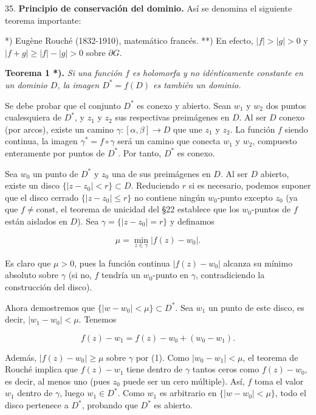 \documentclass{article}
\begin{document}
\hrulefill

35. \textbf{Principio de conservación del dominio.} Así se denomina el siguiente teorema importante:

*) Eugène Rouché (1832-1910), matemático francés.
**) En efecto, \( |f| > |g| > 0 \) y \( |f + g| \geq |f| - |g| > 0 \) sobre \( \partial G \).

\hrulefill

\textbf{Teorema 1 *).} \textit{Si una función \( f \) es holomorfa y no idénticamente constante en un dominio \( D \), la imagen \( D^* = f(D) \) es también un dominio.}

Se debe probar que el conjunto \( D^* \) es conexo y abierto. Sean \( w_1 \) y \( w_2 \) dos puntos cualesquiera de \( D^* \), y \( z_1 \) y \( z_2 \) sus respectivas preimágenes en \( D \). Al ser \( D \) conexo (por arcos), existe un camino \( \gamma: [\alpha, \beta] \to D \) que une \( z_1 \) y \( z_2 \). La función \( f \) siendo continua, la imagen \( \gamma^* = f \circ \gamma \) será un camino que conecta \( w_1 \) y \( w_2 \), compuesto enteramente por puntos de \( D^* \). Por tanto, \( D^* \) es conexo.

Sea \( w_0 \) un punto de \( D^* \) y \( z_0 \) una de sus preimágenes en \( D \). Al ser \( D \) abierto, existe un disco \( \{|z - z_0| < r\} \subset D \). Reduciendo \( r \) si es necesario, podemos suponer que el disco cerrado \( \{|z - z_0| \leq r\} \) no contiene ningún \( w_0 \)-punto excepto \( z_0 \) (ya que \( f \neq \text{const} \), el teorema de unicidad del §22 establece que los \( w_0 \)-puntos de \( f \) están aislados en \( D \)). Sea \( \gamma = \{|z - z_0| = r\} \) y definamos

\[\mu = \min_{z \in \gamma} |f(z) - w_0|. \tag{1}\]

Es claro que \( \mu > 0 \), pues la función continua \( |f(z) - w_0| \) alcanza su mínimo absoluto sobre \( \gamma \) (si no, \( f \) tendría un \( w_0 \)-punto en \( \gamma \), contradiciendo la construcción del disco).

Ahora demostremos que \( \{|w - w_0| < \mu\} \subset D^* \). Sea \( w_1 \) un punto de este disco, es decir, \( |w_1 - w_0| < \mu \). Tenemos

\[f(z) - w_1 = f(z) - w_0 + (w_0 - w_1). \tag{2}\]

Además, \( |f(z) - w_0| \geq \mu \) sobre \( \gamma \) por (1). Como \( |w_0 - w_1| < \mu \), el teorema de Rouché implica que \( f(z) - w_1 \) tiene dentro de \( \gamma \) tantos ceros como \( f(z) - w_0 \), es decir, al menos uno (pues \( z_0 \) puede ser un cero múltiple). Así, \( f \) toma el valor \( w_1 \) dentro de \( \gamma \), luego \( w_1 \in D^* \). Como \( w_1 \) es arbitrario en \( \{|w - w_0| < \mu\} \), todo el disco pertenece a \( D^* \), probando que \( D^* \) es abierto.
\end{document}
